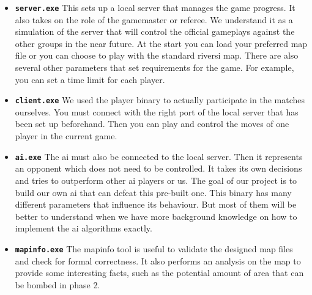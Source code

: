 \begin{itemize}
    \item \textbf{\texttt{server.exe}} \newline
    This sets up a local server that manages the game progress. It also takes on the role of the gamemaster or referee. We understand it as a simulation of the server that will control the official gameplays against the other groups in the near future. At the start you can load your preferred map file or you can choose to play with the standard riversi map. There are also several other parameters that set requirements for the game. For example, you can set a time limit for each player.
    \item \textbf{\texttt{client.exe}} \newline
    We used the player binary to actually participate in the matches ourselves. You must connect with the right port of the local server that has been set up beforehand. Then you can play and control the moves of one player in the current game.
    \item \textbf{\texttt{ai.exe}} \newline
    The ai must also be connected to the local server. Then it represents an opponent which does not need to be controlled. It takes its own decisions and tries to outperform other ai players or us. The goal of our project is to build our own ai that can defeat this pre-built one. This binary has many different parameters that influence its behaviour. But most of them will be better to understand when we have more background knowledge on how to implement the ai algorithms exactly.
    \item \textbf{\texttt{mapinfo.exe}} \newline
    The mapinfo tool is useful to validate the designed map files and check for formal correctness. It also performs an analysis on the map to provide some interesting facts, such as the potential amount of area that can be bombed in phase 2. 
\end{itemize}